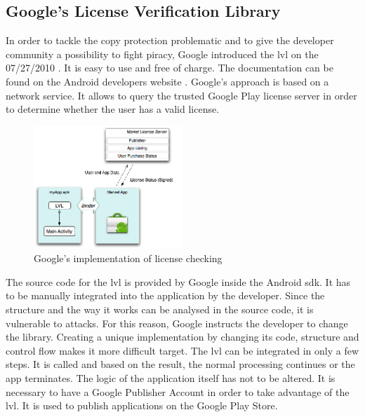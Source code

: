\subsection{Google's License Verification Library} \label{section:license-google}
In order to tackle the copy protection problematic and to give the developer community a possibility to fight piracy, Google introduced the \gls{lvl} on the 07/27/2010 \cite{developersLicensingBlog}.
It is easy to use and free of charge.
The documentation can be found on the Android developers website \cite{developersLicensingOverview}.
\newline
Google's approach is based on a network service.
It allows to query the trusted Google Play license server in order to determine whether the user has a valid license.
\newline
\begin{figure}[h]
    \centering
    \includegraphics[width=0.5\textwidth]{data/lvl.png}
    \caption{Google's implementation of license checking \cite{developersLicensingOverview}}
    \label{fig:lvl}
\end{figure}
\newline
The source code for the \gls{lvl} is provided by Google inside the Android \gls{sdk}.
It has to be manually integrated into the application by the developer.
Since the structure and the way it works can be analysed in the source code, it is vulnerable to attacks.
For this reason, Google instructs the developer to change the library.
Creating a unique implementation by changing its code, structure and control flow makes it more difficult target.
\newline
The \gls{lvl} can be integrated in only a few steps.
It is called and based on the result, the normal processing continues or the app terminates.
The logic of the application itself has not to be altered.
\newline
It is necessary to have a Google Publisher Account in order to take advantage of the \gls{lvl}.
It is used to publish applications on the Google Play Store.
